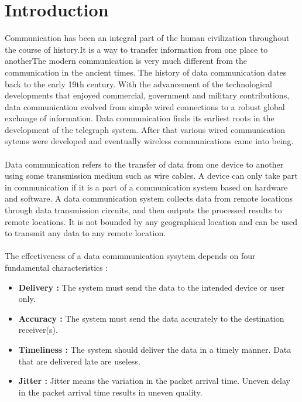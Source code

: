 \documentclass[12pt,a4paper]{article}%
\begin{document}
	\pagebreak
	\tableofcontents
	\cleardoublepage
	\section{Introduction}\label{sec:intro}
	\begin{flushleft}
		Communication has been an integral part of the human civilization throughout the course of history.It is a way to transfer information from one place to anotherThe modern communication is very much different from 
		the communication in the ancient times.
		The history of data communication dates back to the early 19th century. With the advancement of the technological developments that enjoyed commercial, government and military contributions, data communication
		evolved from simple wired connections to a robust global exchange of information. Data communication finds its earliest roots in the development of the telegraph system. After that various wired communication sytems were
		developed and eventually wireless communications came into being.
		\paragraph{}
		Data communication refers to the transfer of data from one device to another using some transmission medium such as wire cables. A device can only take part in communication if it is a part of a communication system based 
		on hardware and software. A data communication system collects data from remote locations through data transmission circuits, and then outputs the processed results to remote locations. It is not bounded by any geographical 
		location and can be used to transmit any data to any remote location.
		\paragraph{}
		The effectiveness of a data commmunication sysytem depends on four fundamental characteristics :
		\begin{itemize}
			\item \textbf{Delivery : } The system must send the data to the intended device or user only.
			\item \textbf{Accuracy : } The system must send the data accurately to the destination receiver(s). 
			\item \textbf{Timeliness : } The system should deliver the data in a timely manner. Data that are delivered late are useless.
			\item \textbf{Jitter : } Jitter means the variation in the packet arrival time. Uneven delay in the packet arrival time results in uneven quality.
		\end{itemize}

\end{flushleft}
\end{document}
